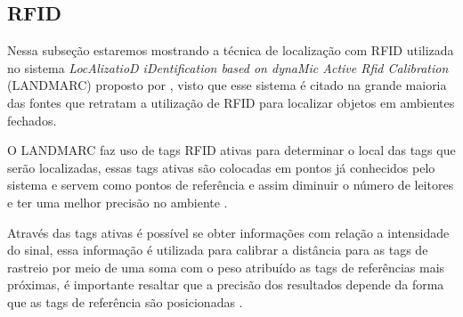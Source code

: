     \subsection{RFID}
    \par
    Nessa subseção estaremos mostrando a técnica de localização com RFID utilizada no sistema \textit{LocAlizatioD iDentification based on dynaMic Active Rfid Calibration} (LANDMARC) proposto por \citeauthor{landmarc}, visto que esse sistema é citado na grande maioria das fontes que retratam a utilização de RFID para localizar objetos em ambientes fechados.
    
    \par
    O LANDMARC faz uso de tags RFID ativas para determinar o local das tags que serão localizadas, essas tags ativas são colocadas em pontos já conhecidos pelo sistema e servem como pontos de referência e assim diminuir o número de leitores e ter uma melhor precisão no ambiente \cite{RFIDapplicationsTechniques}.
    
    \par
    Através das tags ativas é possível se obter informações com relação a intensidade do sinal, essa informação é utilizada para calibrar a distância para as tags de rastreio por meio de uma soma com o peso atribuído as tags de referências mais próximas, é importante resaltar que a precisão dos resultados depende da forma que as tags de referência são posicionadas \cite{RFIDapplicationsTechniques}.
    
